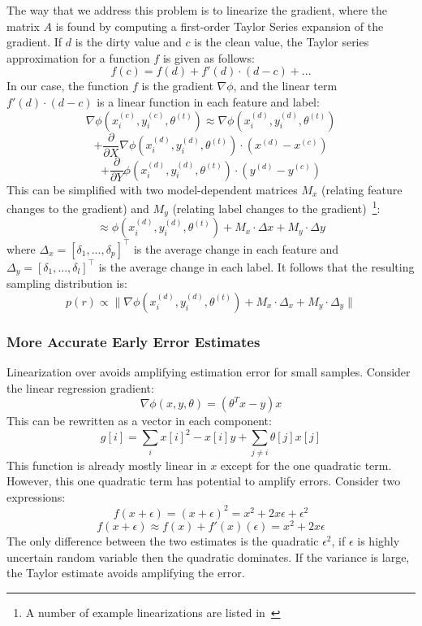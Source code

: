 The way that we address this problem is to linearize the gradient, where the matrix $A$ is found by computing a first-order Taylor Series expansion of the gradient.
If $d$ is the dirty value and $c$ is the clean value, the Taylor series approximation for a function $f$ is given as follows:
\[
f(c) = f(d) + f'(d)\cdot(d-c) + ...
\]
In our case, the function $f$ is the gradient $\nabla\phi$, and the linear term $f'(d)\cdot(d-c)$ is a linear function in each feature and label:
\[
\nabla\phi(x^{(c)}_i,y^{(c)}_i,\theta^{(t)}) \approx 
\nabla\phi(x^{(d)}_i,y^{(d)}_i,\theta^{(t)}) 
\]
\[
+ \frac{\partial}{\partial X}\nabla\phi(x^{(d)}_i,y^{(d)}_i,\theta^{(t)})
\cdot (x^{(d)} - x^{(c)}) 
\]
\[+ \frac{\partial}{\partial Y}\phi(x^{(d)}_i,y^{(d)}_i,\theta^{(t)})\cdot (y^{(d)} - y^{(c)})
\]
This can be simplified with two model-dependent matrices $M_x$ (relating feature changes to the gradient) and $M_y$ (relating label changes to the gradient)~\footnote{A number of example linearizations are listed in~\cite{activecleanarxiv}}:
\[
\approx \phi(x^{(d)}_i,y^{(d)}_i,\theta^{(t)}) + M_x \cdot \Delta x + M_y \cdot \Delta y
\]
where $\Delta_x = [\delta_1, ..., \delta_p]^{\intercal}$ is the average change in each feature and $\Delta_y = [\delta_1, ..., \delta_l]^{\intercal}$ is the average change in each label.
It follows that the resulting sampling distribution is:
\[
p(r)\propto\|\nabla\phi(x^{(d)}_i,y^{(d)}_i,\theta^{(t)}) + M_x \cdot \Delta_{x} +  M_y \cdot \Delta_{y}\|
\]

\iffalse
\subsubsection{More Accurate Early Error Estimates}\label{acc}
Linearization over avoids amplifying estimation error for small samples.
Consider the linear regression gradient:
\[
\nabla\phi(x,y,\theta) = (\theta^Tx - y)x
\]
This can be rewritten as a vector in each component:
\[
g[i] = \sum_{i} x[i]^2-x[i]y + \sum_{j \ne i} \theta[j]x[j]
\]
This function is already mostly linear in $x$ except for the one quadratic term.
However, this one quadratic term has potential to amplify errors.
Consider two expressions:
\[
f(x+\epsilon) = (x+\epsilon)^2 = x^2 + 2x\epsilon + \epsilon^2
\]
\[
f(x+\epsilon) \approx f(x) + f'(x)(\epsilon) = x^2 + 2x\epsilon
\]
The only difference between the two estimates is the quadratic $\epsilon^2$, if $\epsilon$ is highly uncertain random variable then the quadratic dominates.
If the variance is large, the Taylor estimate avoids amplifying the error.



